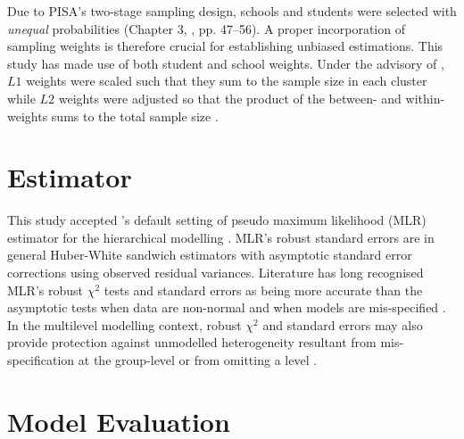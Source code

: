 Due to PISA's two-stage sampling design, schools and students were selected with \emph{unequal} probabilities (Chapter 3, \textcite{PISAspss}, pp. 47--56). A proper incorporation of sampling weights is therefore crucial for establishing unbiased estimations. This study has made use of both student and school weights. Under the advisory of \textcite{asparouhov:2006}, $L1$ weights were scaled such that they sum to the sample size in each cluster while $L2$ weights were adjusted so that the product of the between- and within-weights sums to the total sample size \parencite[][pp. 622--624]{mplus:manual}.

\section{Estimator}\label{sec:mlr}

This study accepted \CM's default setting of pseudo maximum likelihood (MLR) estimator for the hierarchical modelling \parencite[Chapter 16,][pp. 666 \& 668]{mplus:manual}. MLR's robust standard errors are in general Huber-White sandwich estimators \parencite{huber:1967, white:1982} with asymptotic standard error corrections using observed residual variances. Literature has long recognised MLR's robust $\chi^2$ tests and standard errors as being more accurate than the asymptotic tests when data are non-normal and when models are mis-specified \parencite{chou:1991, curran:1996}. In the multilevel modelling context, robust $\chi^2$ and standard errors may also provide protection against unmodelled heterogeneity resultant from mis-specification at the group-level or from omitting a level \parencite{hox:2010}.

\section{Model Evaluation}

